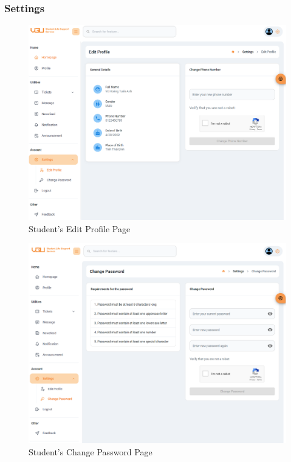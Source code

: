 	
	\subsubsection{Settings}
	\begin{figure}[H]
		\centering
		\includegraphics[width=1.0\linewidth]{graphics/gui/student/sett-edit-profile}
		\caption{Student's Edit Profile Page}
		\label{fig:gui-std-sett-edit-profile}
	\end{figure}
	
	
	\begin{figure}[H]
		\centering
		\includegraphics[width=1.0\linewidth]{graphics/gui/student/sett-password}
		\caption{Student's Change Password Page}
		\label{fig:gui-std-sett-password}
	\end{figure}
	
